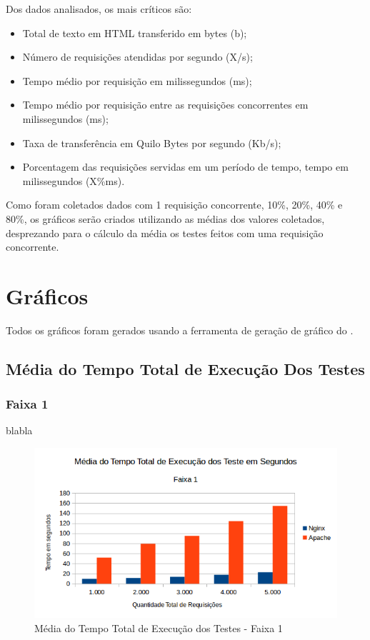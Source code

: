 Dos dados analisados, os mais críticos são:

\begin{itemize}
	\item Total de texto em HTML transferido em bytes (b);
	\item Número de requisições atendidas por segundo (X/s);
	\item Tempo médio por requisição em milissegundos (ms);
	\item Tempo médio por requisição entre as requisições concorrentes em milissegundos (ms);
	\item Taxa de transferência em Quilo Bytes por segundo (Kb/s);
	\item Porcentagem das requisições servidas em um período de tempo, tempo em milissegundos (X\%ms).
\end{itemize}

Como foram coletados dados com 1 requisição concorrente, 10\%, 20\%, 40\% e 80\%, os gráficos serão criados utilizando as médias dos valores coletados, desprezando para o cálculo da média os testes feitos com uma requisição concorrente.

\section{Gráficos}
Todos os gráficos foram gerados usando a ferramenta de geração de gráfico do .
\subsection{Média do Tempo Total de Execução Dos Testes}
\subsubsection{Faixa 1}

blabla
\begin{figure}[H]
	\centering
	\includegraphics[width=0.6\linewidth]{graficos/grafico1-f1} 
	\caption{Média do Tempo Total de Execução dos Testes - Faixa 1}
	\label{fig:grafico1-f1}
\end{figure}

